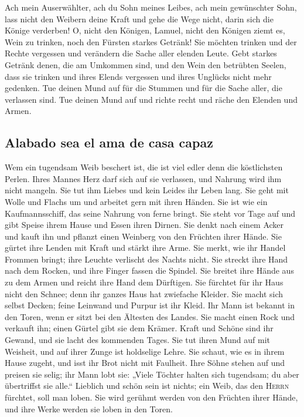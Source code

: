  Ach mein Auserwählter, ach du Sohn meines Leibes, ach
mein gewünschter Sohn,  lass nicht den Weibern deine Kraft
und gehe die Wege nicht, darin sich die Könige verderben! 
O, nicht den Königen, Lamuel, nicht den Königen ziemt es, Wein zu
trinken, noch den Fürsten starkes Getränk!  Sie möchten
trinken und der Rechte vergessen und verändern die Sache aller elenden
Leute.  Gebt starkes Getränk denen, die am Umkommen sind,
und den Wein den betrübten Seelen,  dass sie trinken und
ihres Elends vergessen und ihres Unglücks nicht mehr gedenken.
 Tue deinen Mund auf für die Stummen und für die Sache
aller, die verlassen sind.  Tue deinen Mund auf und richte
recht und räche den Elenden und Armen.

\hypertarget{alabado-sea-el-ama-de-casa-capaz}{%
\subsection{Alabado sea el ama de casa
capaz}\label{alabado-sea-el-ama-de-casa-capaz}}

 Wem ein tugendsam Weib beschert ist, die ist viel edler
denn die köstlichsten Perlen.  Ihres Mannes Herz darf
sich auf sie verlassen, und Nahrung wird ihm nicht mangeln.
 Sie tut ihm Liebes und kein Leides ihr Leben lang.
 Sie geht mit Wolle und Flachs um und arbeitet gern mit
ihren Händen.  Sie ist wie ein Kaufmannsschiff, das seine
Nahrung von ferne bringt.  Sie steht vor Tage auf und
gibt Speise ihrem Hause und Essen ihren Dirnen.  Sie
denkt nach einem Acker und kauft ihn und pflanzt einen Weinberg von den
Früchten ihrer Hände.  Sie gürtet ihre Lenden mit Kraft
und stärkt ihre Arme.  Sie merkt, wie ihr Handel Frommen
bringt; ihre Leuchte verlischt des Nachts nicht.  Sie
streckt ihre Hand nach dem Rocken, und ihre Finger fassen die Spindel.
 Sie breitet ihre Hände aus zu dem Armen und reicht ihre
Hand dem Dürftigen.  Sie fürchtet für ihr Haus nicht den
Schnee; denn ihr ganzes Haus hat zwiefache Kleider.  Sie
macht sich selbst Decken; feine Leinwand und Purpur ist ihr Kleid.
 Ihr Mann ist bekannt in den Toren, wenn er sitzt bei den
Ältesten des Landes.  Sie macht einen Rock und verkauft
ihn; einen Gürtel gibt sie dem Krämer.  Kraft und Schöne
sind ihr Gewand, und sie lacht des kommenden Tages.  Sie
tut ihren Mund auf mit Weisheit, und auf ihrer Zunge ist holdselige
Lehre.  Sie schaut, wie es in ihrem Hause zugeht, und
isst ihr Brot nicht mit Faulheit.  Ihre Söhne stehen auf
und preisen sie selig; ihr Mann lobt sie:  „Viele Töchter
halten sich tugendsam; du aber übertriffst sie alle.`` 
Lieblich und schön sein ist nichts; ein Weib, das den \textsc{Herrn}
fürchtet, soll man loben.  Sie wird gerühmt werden von
den Früchten ihrer Hände, und ihre Werke werden sie loben in den Toren.
